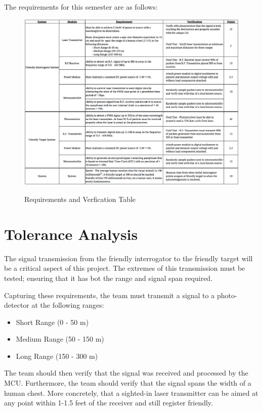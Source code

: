 \documentclass[openbib,letterpaper,10pt]{article}
\begin{document}
\begin{spacing}{1.15}
The requirements for this semester are as follows: 
\begin{figure} [H]
	\centering
	\includegraphics[scale=0.5]{Requirements-Verification-Table.png}
	\label{fig:brequirements-table}
	\caption{Requirements and Verfication Table}
\end{figure}

\section{Tolerance Analysis}
The signal transmission from the friendly interrogator to the friendly target will be a critical aspect of this project. The extremes of this transmission must be tested; ensuring that it has bot the range and signal span required. 

Capturing these requirements, the team must transmit a signal to a photo-detector at the following ranges:
		\begin{itemize}
			\item Short Range (0 - 50 m)
			\item Medium Range (50 - 150 m)
			\item Long Range (150 - 300 m)
		\end{itemize}

The team should then verify that the signal was received and processed by the MCU. Furthermore, the team should verify that the signal spans the width of a human chest. More concretely, that a sighted-in laser transmitter can be aimed at any point within 1-1.5 feet of the receiver and still register friendly. 


\end{spacing}
\end{document}
